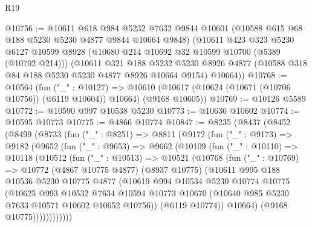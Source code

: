 \begin{lexlean}{R19}
\begin{coremodule}
@10756 := @10611
    @618
    @984
    @5232
    @7632
    @9844
    @10601
    (@10588 @615 @68 @188 @5230 @5230 @4877 @9844 @10664 @9848)
    (@10611
      @423
      @323
      @5230
      @6127
      @10599
      @8928
      (@10680 @214 @10692 @32 @10599 @10700 (@5389 (@10702 @214)))
      (@10611
        @321
        @188
        @5232
        @5230
        @8926
        @4877
        (@10588 @318 @84 @188 @5230 @5230 @4877 @8926 @10664 @9154)
        @10664))
@10768 := @10564
    (fun ("_" : @10127) =>
    @10610 (@10617 (@10624 (@10671 (@10706 @10756)) (@6119 @10604)) @10664) (@9168 @10605))
@10769 := @10126 @5589
@10772 := @10590 @997 @10538 @5230
@10773 := @10636 @10602
@10774 := @10595 @10773
@10775 := @4866 @10774
@10847 := @8235
    (@8437
      (@8452
        (@8499
          (@8733
            (fun ("_" : @8251) =>
            @8811
              (@9172
                (fun ("_" : @9173) =>
                @9182
                  (@9652
                    (fun ("_" : @9653) =>
                    @9662
                      (@10109
                        (fun ("_" : @10110) =>
                        @10118
                          (@10512
                            (fun ("_" : @10513) =>
                            @10521
                              (@10768
                                (fun ("_" : @10769) =>
                                @10772
                                  (@4867 @10775 @4877)
                                  (@8937 @10775)
                                  (@10611
                                    @995
                                    @188
                                    @10536
                                    @5230
                                    @10775
                                    @4877
                                    (@10619
                                      @994
                                      @10534
                                      @5230
                                      @10774
                                      @10775
                                      (@10625
                                        @993
                                        @10532
                                        @7634
                                        @10594
                                        @10773
                                        @10670
                                        (@10640 @985 @5230 @7633 @10571 @10602 @10652 @10756))
                                      (@6119 @10774))
                                    @10664)
                                  (@9168 @10775))))))))))))

\end{coremodule}
\end{lexlean}
